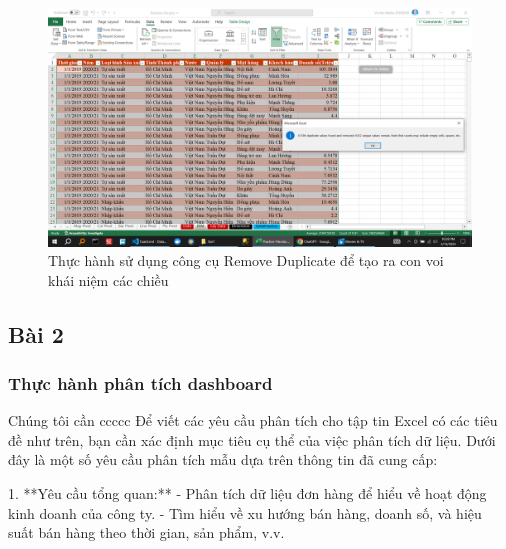 \documentclass{article}
\begin{document}
\begin{itemize}
\begin{figure}[H]
\centering
\includegraphics[scale = 0.15]{Bai1/ThucHanh/2.png}
\caption{Thực hành sử dụng công cụ Remove Duplicate để tạo ra con voi khái niệm các chiều}
\end{figure}

\end{itemize}

\subsection{Bài 2}



\subsubsection{Thực hành phân tích dashboard}
Chúng tôi cần ccccc
Để viết các yêu cầu phân tích cho tập tin Excel có các tiêu đề như trên, bạn cần xác định mục tiêu cụ thể của việc phân tích dữ liệu. Dưới đây là một số yêu cầu phân tích mẫu dựa trên thông tin đã cung cấp:

1. **Yêu cầu tổng quan:**
   - Phân tích dữ liệu đơn hàng để hiểu về hoạt động kinh doanh của công ty.
   - Tìm hiểu về xu hướng bán hàng, doanh số, và hiệu suất bán hàng theo thời gian, sản phẩm, v.v.
\end{document}
